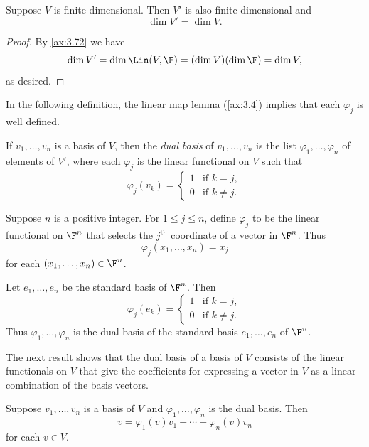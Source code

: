 \begin{result}[$\dim V'=\dim V$]\label{ax:3.111}
Suppose $V$ is finite-dimensional. Then $V'$ is also finite-dimensional and
\[ \dim V' = \dim V. \]
\end{result}

\begin{proof}
By \ref{ax:3.72} we have
\[ \dim V' = \dim\Lin(V,\F) = (\dim V)(\dim\F) = \dim V, \]
as desired.
\end{proof}

In the following definition, the linear map lemma (\ref{ax:3.4}) implies that
each $\varphi_j$ is well defined.

\begin{definition}\label{ax:3.112}
If $v_1,\dots,v_n$ is a basis of $V$, then the \emph{dual basis} of
$v_1,\dots,v_n$ is the list $\varphi_1,\dots,\varphi_n$ of elements of $V'$,
where each $\varphi_j$ is the linear functional on $V$ such that
\[ \varphi_j(v_k) = \begin{cases} 1 & \text{if } k=j,\\
                                 0 & \text{if } k\ne j. \end{cases} \]
\end{definition}

\begin{example}\label{ax:3.113}
Suppose $n$ is a positive integer. For $1\le j\le n$, define $\varphi_j$ to be
the linear functional on $\F^n$ that selects the $j^{\text{th}}$ coordinate of a
vector in $\F^n$. Thus
\[ \varphi_j(x_1,\dots,x_n) = x_j \]
for each $(x_1,\dots,x_n)\in\F^n$.

Let $e_1,\dots,e_n$ be the standard basis of $\F^n$. Then
\[ \varphi_j(e_k) = \begin{cases} 1 & \text{if } k=j,\\
                                 0 & \text{if } k\ne j. \end{cases} \]
Thus $\varphi_1,\dots,\varphi_n$ is the dual basis of the standard basis
$e_1,\dots,e_n$ of $\F^n$.
\end{example}

The next result shows that the dual basis of a basis of $V$ consists of the
linear functionals on $V$ that give the coefficients for expressing a vector in
$V$ as a linear combination of the basis vectors.

\begin{result}\label{ax:3.114}
Suppose $v_1,\dots,v_n$ is a basis of $V$ and $\varphi_1,\dots,\varphi_n$ is the
dual basis. Then
\[ v = \varphi_1(v)v_1+\cdots+\varphi_n(v)v_n \]
for each $v\in V$.
\end{result}

